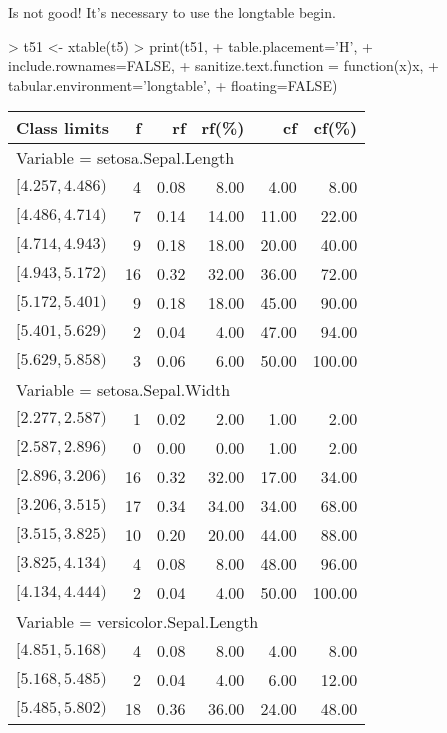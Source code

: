 \documentclass[10pt,a4paper]{article}
\begin{document}
Is not good! It's necessary to use the longtable begin.

\begin{Schunk}
\begin{Sinput}
> t51 <- xtable(t5)
> print(t51,
+       table.placement='H',
+       include.rownames=FALSE,
+       sanitize.text.function = function(x){x},
+       tabular.environment='longtable',
+       floating=FALSE)
\end{Sinput}
% latex table generated in R 4.4.0 by xtable 1.8-4 package
% Fri Nov 17 16:34:40 2023
\begin{longtable}{lrrrrr}
  \hline
Class limits & f & rf & rf(\%) & cf & cf(\%) \\ 
  \hline
\multicolumn{6}{l}{Variable = setosa.Sepal.Length}\\
$[4.257,4.486)$ &   4 & 0.08 & 8.00 & 4.00 & 8.00 \\ 
  $[4.486,4.714)$ &   7 & 0.14 & 14.00 & 11.00 & 22.00 \\ 
  $[4.714,4.943)$ &   9 & 0.18 & 18.00 & 20.00 & 40.00 \\ 
  $[4.943,5.172)$ &  16 & 0.32 & 32.00 & 36.00 & 72.00 \\ 
  $[5.172,5.401)$ &   9 & 0.18 & 18.00 & 45.00 & 90.00 \\ 
  $[5.401,5.629)$ &   2 & 0.04 & 4.00 & 47.00 & 94.00 \\ 
  $[5.629,5.858)$ &   3 & 0.06 & 6.00 & 50.00 & 100.00 \\ 
   \hline
\multicolumn{6}{l}{Variable = setosa.Sepal.Width}\\
$[2.277,2.587)$ &   1 & 0.02 & 2.00 & 1.00 & 2.00 \\ 
  $[2.587,2.896)$ &   0 & 0.00 & 0.00 & 1.00 & 2.00 \\ 
  $[2.896,3.206)$ &  16 & 0.32 & 32.00 & 17.00 & 34.00 \\ 
  $[3.206,3.515)$ &  17 & 0.34 & 34.00 & 34.00 & 68.00 \\ 
  $[3.515,3.825)$ &  10 & 0.20 & 20.00 & 44.00 & 88.00 \\ 
  $[3.825,4.134)$ &   4 & 0.08 & 8.00 & 48.00 & 96.00 \\ 
  $[4.134,4.444)$ &   2 & 0.04 & 4.00 & 50.00 & 100.00 \\ 
   \hline
\multicolumn{6}{l}{Variable = versicolor.Sepal.Length}\\
$[4.851,5.168)$ &   4 & 0.08 & 8.00 & 4.00 & 8.00 \\ 
  $[5.168,5.485)$ &   2 & 0.04 & 4.00 & 6.00 & 12.00 \\ 
  $[5.485,5.802)$ &  18 & 0.36 & 36.00 & 24.00 & 48.00 \\ 

\end{longtable}
\end{Schunk}
\end{document}
